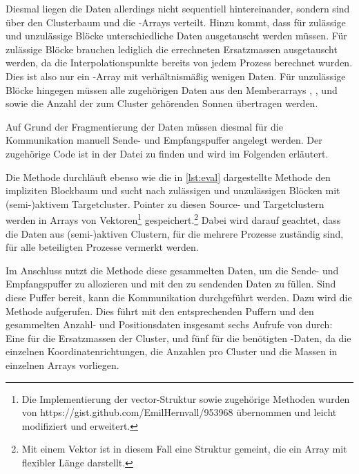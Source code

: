     Diesmal liegen die Daten allerdings nicht sequentiell hintereinander, sondern sind über den Clusterbaum und die -Arrays verteilt. Hinzu kommt, dass für zulässige und unzulässige
    Blöcke unterschiedliche Daten ausgetauscht werden müssen. Für zulässige Blöcke brauchen lediglich die errechneten Ersatzmassen ausgetauscht werden, da die Interpolationspunkte bereits von jedem 
    Prozess berechnet wurden. Dies ist also nur ein -Array mit verhältnismäßig wenigen Daten.
    Für unzulässige Blöcke hingegen müssen alle zugehörigen Daten aus den Memberarrays , ,  und  sowie die Anzahl der zum Cluster gehörenden
    Sonnen übertragen werden.
    
    Auf Grund der Fragmentierung der Daten müssen diesmal für die Kommunikation manuell Sende- und Empfangspuffer angelegt werden. Der zugehörige Code ist in der Datei  zu finden und wird
    im Folgenden erläutert.
    
    Die Methode  durchläuft ebenso wie die in \autoref{lst:eval} dargestellte Methode  den impliziten Blockbaum und sucht nach 
    zulässigen und unzulässigen Blöcken mit (semi-)aktivem Targetcluster. Pointer zu diesen Source- und Targetclustern werden in Arrays von Vektoren\footnote{Die Implementierung der vector-Struktur
    sowie zugehörige Methoden wurden von https://\-gist.\-github.com/\-EmilHernvall/953968 übernommen und leicht modifiziert und erweitert.} gespeichert.\footnote{Mit einem Vektor ist in diesem Fall 
    eine Struktur gemeint, die ein Array mit flexibler Länge darstellt.} Dabei wird darauf geachtet, dass die Daten aus (semi-)aktiven Clustern, für die mehrere Prozesse zuständig sind, für alle 
    beteiligten Prozesse vermerkt werden.
    
    Im Anschluss nutzt die Methode  diese gesammelten Daten, um die Sende- und Empfangspuffer zu allozieren und mit den zu sendenden Daten zu füllen. Sind diese Puffer bereit,
    kann die Kommunikation durchgeführt werden. Dazu wird die Methode  aufgerufen. Dies führt mit den entsprechenden Puffern und den gesammelten Anzahl- und Positionsdaten
    insgesamt sechs Aufrufe von  durch: Eine für die Ersatzmassen der Cluster, und fünf für die benötigten -Daten, da die einzelnen Koordinatenrichtungen, die 
    Anzahlen pro Cluster und die Massen in einzelnen Arrays vorliegen.
    
